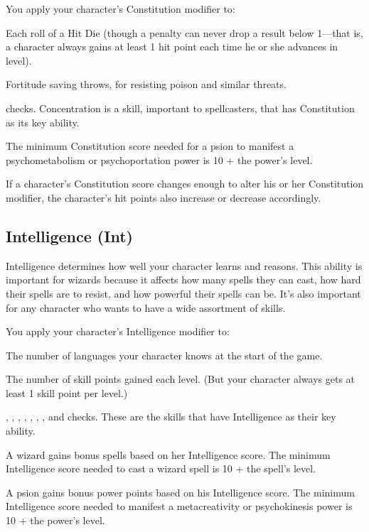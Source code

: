 You apply your character's Constitution modifier to:
\begin{itemize*}
\item Each roll of a Hit Die (though a penalty can never drop a result below 1---that is, a character always gains at least 1 hit point each time he or she advances in level).
\item Fortitude saving throws, for resisting poison and similar threats.
\item {} checks. Concentration is a skill, important to spellcasters, that has Constitution as its key ability.
\end{itemize*}

The minimum Constitution score needed for a psion to manifest a psychometabolism or psychoportation power is 10 + the power's level.

If a character's Constitution score changes enough to alter his or her Constitution modifier, the character's hit points also increase or decrease accordingly.

\subsection{Intelligence (Int)}
Intelligence determines how well your character learns and reasons. This ability is important for wizards because it affects how many spells they can cast, how hard their spells are to resist, and how powerful their spells can be. It's also important for any character who wants to have a wide assortment of skills.

You apply your character's Intelligence modifier to:
\begin{itemize*}
\item The number of languages your character knows at the start of the game.
\item The number of skill points gained each level. (But your character always gets at least 1 skill point per level.)
\item {}, , , , , , , and  checks. These are the skills that have Intelligence as their key ability.
\end{itemize*}

A wizard gains bonus spells based on her Intelligence score. The minimum Intelligence score needed to cast a wizard spell is 10 + the spell's level.

A psion gains bonus power points based on his Intelligence score. The minimum Intelligence score needed to manifest a metacreativity or psychokinesis power is 10 + the power's level.

